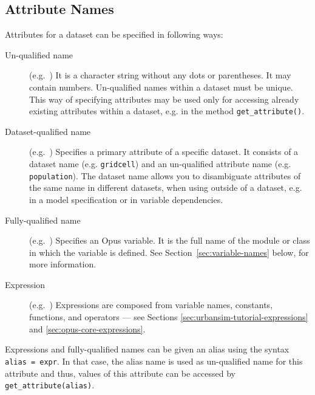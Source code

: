 \subsection{Attribute Names}
\label{sec:opus-core-attribute-names}
%
Attributes \attributesindex for a dataset \datasetindex can be specified in following ways:

\begin{description}
\item[Un-qualified name] (e.g.\ ) It is a character string
  without any dots or parentheses. It may contain numbers. Un-qualified
  names within a dataset \datasetindex must be unique. This way of
  specifying attributes \attributesindex may be used only for accessing
  already existing attributes \attributesindex within a dataset,
  \datasetindex e.g.  in the method
  \verb|get_attribute()|. \attributesindex

\item[Dataset-qualified name] (e.g.\ ) Specifies
  a primary attribute \attributesindex of a specific dataset. \datasetindex
  It consists of a dataset \datasetindex name (e.g.  \verb|gridcell|) and
  an un-qualified attribute \attributesindex name (e.g.
  \verb|population|).  The dataset \datasetindex name allows you to
  disambiguate attributes \attributesindex of the same name in different
  datasets, \datasetindex when using outside of a dataset, \datasetindex
  e.g. in a model specification or in variable \variablesindex
  dependencies.

\item[Fully-qualified name] (e.g.\ )
  Specifies an Opus variable. \variablesindex It is the full name of the
  module or class in which the variable \variablesindex is defined. See
  Section~\ref{sec:variable-names} below, for more information.

\item[Expression] (e.g.\ )
  Expressions are composed from variable names, constants, functions, and
  operators --- see Sections \ref{sec:urbansim-tutorial-expressions} and
  \ref{sec:opus-core-expressions}.

\end{description}
Expressions and fully-qualified names can be given an alias using the syntax
\verb|alias = expr|.  In that case, the alias name is used as un-qualified
name for this attribute and thus, values of this attribute can be accessed
by \verb|get_attribute(alias)|.

